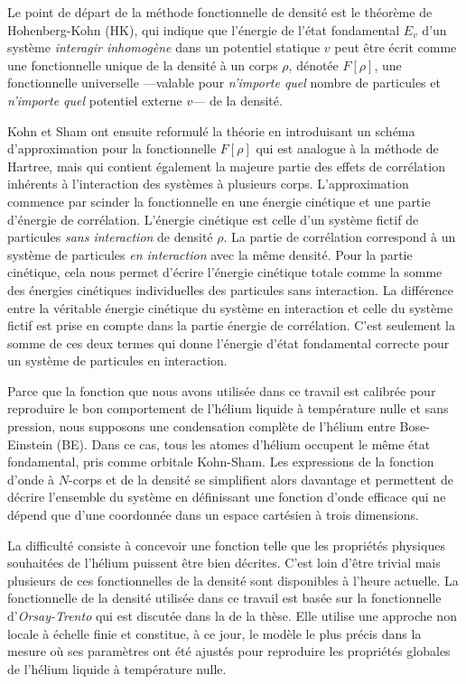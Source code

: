 		Le point de départ de la méthode fonctionnelle de densité est le théorème de Hohenberg-Kohn\citep{Hohenberg1964} (HK), qui indique que l'énergie de l'état fondamental $E_v$ d'un système \emph{interagir inhomogène} dans un potentiel statique $v$ peut être écrit comme une fonctionnelle unique de la densité à un corps $\rho$, dénotée $F[\rho]$, une  fonctionnelle universelle ---valable pour \emph{n'importe quel} nombre de particules et \emph{n'importe quel} potentiel externe $v$--- de la densité.
		
		Kohn et Sham ont ensuite reformulé\citep{Kohn1965} la théorie en introduisant un schéma d'ap\-pro\-xi\-ma\-tion pour la fonctionnelle $F[\rho]$  qui est analogue à la méthode de Hartree, mais qui contient également la majeure partie des effets de corrélation inhérents à l'interaction des systèmes à plusieurs corps. 
		L'approximation commence par scinder la fonctionnelle en une énergie cinétique et une partie d'énergie de corrélation. 
		L'énergie cinétique est celle d'un système fictif de particules \emph{sans interaction} de densité $\rho$. 
		La partie de corrélation correspond à un système de particules \emph{en interaction} avec la même densité. 
		Pour la partie cinétique, cela nous permet d'écrire l'énergie cinétique totale comme la somme des énergies cinétiques individuelles des particules sans interaction. 
		La différence entre la véritable énergie cinétique du système en interaction et celle du système fictif est prise en compte dans la partie énergie de corrélation. 
		C'est seulement la somme de ces deux termes qui donne l'énergie d'état fondamental correcte pour un système de particules en interaction.
		
		Parce que la fonction que nous avons utilisée dans ce travail est calibrée pour reproduire le bon comportement de l'hélium liquide à température nulle et sans pression, nous supposons une condensation complète de l'hélium entre Bose-Einstein (BE). 
		Dans ce cas, tous les atomes d'hélium occupent le même état fondamental, pris comme orbitale Kohn-Sham. 
		Les expressions de la fonction d'onde à $N$-corps et de la densité se simplifient alors davantage et permettent de décrire l'ensemble du système en définissant une fonction d'onde efficace qui ne dépend que d'une coordonnée dans un espace cartésien à trois dimensions.
		
		La difficulté consiste à concevoir une fonction telle que les propriétés physiques souhaitées de l'hélium puissent être bien décrites. 
		C'est loin d'être trivial mais plusieurs de ces fonctionnelles de la densité sont disponibles à l'heure actuelle. 
		La fonctionnelle de la densité utilisée dans ce travail est basée sur la fonctionnelle d'\emph{Orsay-Trento} qui est discutée dans la  de la thèse. 
		Elle utilise une approche non locale à échelle finie et constitue, à ce jour, le modèle le plus précis dans la mesure où ses paramètres ont été ajustés pour reproduire les propriétés globales de l'hélium liquide à température nulle.
		
